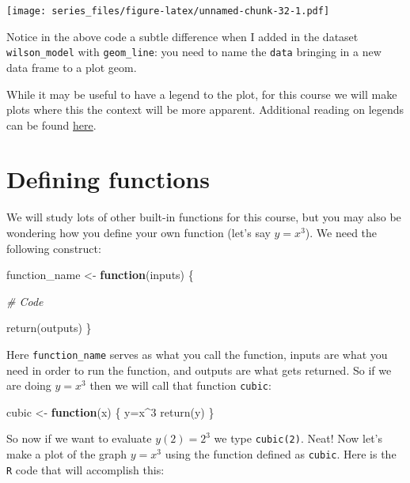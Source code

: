\documentclass[
]{book}
\newenvironment{Shaded}{\begin{snugshade}}{\end{snugshade}}
\newcommand{\CommentTok}[1]{\textcolor[rgb]{0.56,0.35,0.01}{\textit{#1}}}
\newcommand{\ControlFlowTok}[1]{\textcolor[rgb]{0.13,0.29,0.53}{\textbf{#1}}}
\newcommand{\DecValTok}[1]{\textcolor[rgb]{0.00,0.00,0.81}{#1}}
\newcommand{\FunctionTok}[1]{\textcolor[rgb]{0.00,0.00,0.00}{#1}}
\newcommand{\NormalTok}[1]{#1}
\newcommand{\OtherTok}[1]{\textcolor[rgb]{0.56,0.35,0.01}{#1}}
\newcommand{\SpecialCharTok}[1]{\textcolor[rgb]{0.00,0.00,0.00}{#1}}
\theoremstyle{definition}
\theoremstyle{definition}
\theoremstyle{definition}
\theoremstyle{remark}
\begin{document}
\texttt{[image: series\_files/figure-latex/unnamed-chunk-32-1.pdf]}

Notice in the above code a subtle difference when I added in the dataset \texttt{wilson\_model} with \texttt{geom\_line}: you need to name the \texttt{data} bringing in a new data frame to a plot geom.

While it may be useful to have a legend to the plot, for this course we will make plots where this the context will be more apparent. Additional reading on legends can be found \href{http://www.cookbook-r.com/Graphs/Legends_(ggplot2)/}{here}.

\hypertarget{defining-functions}{%
\section{Defining functions}\label{defining-functions}}

We will study lots of other built-in functions for this course, but you may also be wondering how you define your own function (let's say \(y=x^{3}\)). We need the following construct:

\begin{Shaded}
\begin{Highlighting}[]
\NormalTok{function\_name }\OtherTok{\textless{}{-}} \ControlFlowTok{function}\NormalTok{(inputs) \{}
  
  \CommentTok{\# Code}
  
  \FunctionTok{return}\NormalTok{(outputs)}
\NormalTok{\}}
\end{Highlighting}
\end{Shaded}

Here \texttt{function\_name} serves as what you call the function, inputs are what you need in order to run the function, and outputs are what gets returned. So if we are doing \(y=x^{3}\) then we will call that function \texttt{cubic}:

\begin{Shaded}
\begin{Highlighting}[]
\NormalTok{cubic }\OtherTok{\textless{}{-}} \ControlFlowTok{function}\NormalTok{(x) \{}
\NormalTok{  y}\OtherTok{=}\NormalTok{x}\SpecialCharTok{\^{}}\DecValTok{3}
  \FunctionTok{return}\NormalTok{(y)}
\NormalTok{\}}
\end{Highlighting}
\end{Shaded}

So now if we want to evaluate \(y(2)=2^{3}\) we type \texttt{cubic(2)}. Neat! Now let's make a plot of the graph \(y=x^{3}\) using the function defined as \texttt{cubic}. Here is the \texttt{R} code that will accomplish this:
\end{document}
